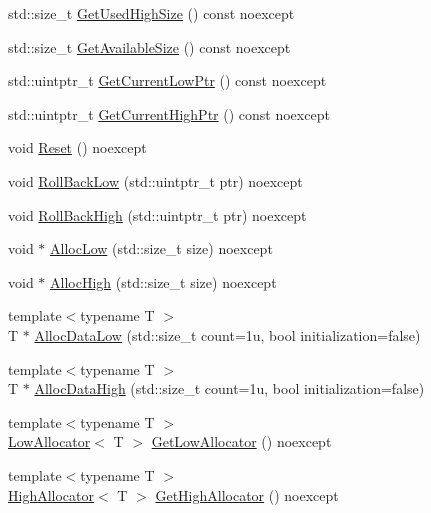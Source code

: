\begin{DoxyCompactItemize}
\item 
std\+::size\+\_\+t \mbox{\hyperlink{classmage_1_1_double_ended_memory_stack_ac4eeccb7d21b8f89f3b838471c9a2416}{Get\+Used\+High\+Size}} () const noexcept
\item 
std\+::size\+\_\+t \mbox{\hyperlink{classmage_1_1_double_ended_memory_stack_a19bd2960457d557f30c99e06cdf22252}{Get\+Available\+Size}} () const noexcept
\item 
std\+::uintptr\+\_\+t \mbox{\hyperlink{classmage_1_1_double_ended_memory_stack_ac7b5f3ef39129df7461f51c306c585f2}{Get\+Current\+Low\+Ptr}} () const noexcept
\item 
std\+::uintptr\+\_\+t \mbox{\hyperlink{classmage_1_1_double_ended_memory_stack_ada139d8c39960c794502bec401182ce9}{Get\+Current\+High\+Ptr}} () const noexcept
\item 
void \mbox{\hyperlink{classmage_1_1_double_ended_memory_stack_a99272e80cde12949a31a2942f9d009d6}{Reset}} () noexcept
\item 
void \mbox{\hyperlink{classmage_1_1_double_ended_memory_stack_a6e75a8b7ca12b93e5f8bcd08444704a6}{Roll\+Back\+Low}} (std\+::uintptr\+\_\+t ptr) noexcept
\item 
void \mbox{\hyperlink{classmage_1_1_double_ended_memory_stack_a2cc8ee694270945bf598cd6bc0f603f0}{Roll\+Back\+High}} (std\+::uintptr\+\_\+t ptr) noexcept
\item 
void $\ast$ \mbox{\hyperlink{classmage_1_1_double_ended_memory_stack_a14bf2c14a15d08e1d6e25b13962811f0}{Alloc\+Low}} (std\+::size\+\_\+t size) noexcept
\item 
void $\ast$ \mbox{\hyperlink{classmage_1_1_double_ended_memory_stack_a3a4f2232ab6cc6cccc0fe78887ae1f2f}{Alloc\+High}} (std\+::size\+\_\+t size) noexcept
\item 
{\footnotesize template$<$typename T $>$ }\\T $\ast$ \mbox{\hyperlink{classmage_1_1_double_ended_memory_stack_a9cff2de6abc54353bac19efc87e64599}{Alloc\+Data\+Low}} (std\+::size\+\_\+t count=1u, bool initialization=false)
\item 
{\footnotesize template$<$typename T $>$ }\\T $\ast$ \mbox{\hyperlink{classmage_1_1_double_ended_memory_stack_a907b4e54a9c30dd8fdb580fde35cf7ee}{Alloc\+Data\+High}} (std\+::size\+\_\+t count=1u, bool initialization=false)
\item 
{\footnotesize template$<$typename T $>$ }\\\mbox{\hyperlink{classmage_1_1_double_ended_memory_stack_1_1_low_allocator}{Low\+Allocator}}$<$ T $>$ \mbox{\hyperlink{classmage_1_1_double_ended_memory_stack_aa83468994c7becc35c90081f932e37f2}{Get\+Low\+Allocator}} () noexcept
\item 
{\footnotesize template$<$typename T $>$ }\\\mbox{\hyperlink{classmage_1_1_double_ended_memory_stack_1_1_high_allocator}{High\+Allocator}}$<$ T $>$ \mbox{\hyperlink{classmage_1_1_double_ended_memory_stack_a8838d2a8eeaab044fff6bfce4bbaccdc}{Get\+High\+Allocator}} () noexcept
\end{DoxyCompactItemize}
